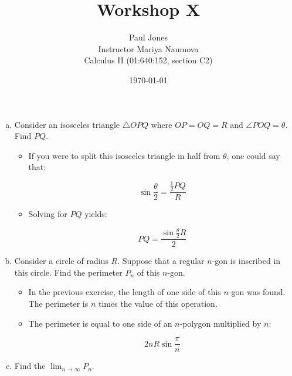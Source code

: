 \documentclass[11pt]{article}
\title{Workshop X}
\author{Paul Jones \\
		Instructor Mariya Naumova\\
		Calculus II (01:640:152, section C2)}
\date{\today}
\begin{document}
\maketitle

\pagebreak

\begin{enumerate}[a)]

	\item Consider an isosceles triangle $\bigtriangleup OPQ$ where $OP = OQ = R$
	and $\angle POQ = \theta$. Find $PQ$.
	
		\begin{itemize}
		
			\item If you were to split this isosceles triangle in half from
			$\theta$, one could say that:
			
			\begin{equation*}
				\sin\frac{\theta}{2} = \frac{\frac{1}{2}PQ}{R}
			\end{equation*}
			
			\item Solving for $PQ$ yields:

			\begin{equation*}
				PQ = \frac{\sin\frac{\theta}{2}R}{2}
			\end{equation*}			
			
		
		\end{itemize}
	
	\item Consider a circle of radius $R$. Suppose that a regular $n$-gon is 
	inscribed in this circle. Find the perimeter $P_n$ of this $n$-gon.
	
		\begin{itemize}
	
			\item In the previous exercise, the length of one side of this 
			$n$-gon was found. The perimeter is $n$ times the value of this
			operation.
			
			\item The perimeter is equal to one side of an $n$-polygon multiplied
			by $n$:
			
			\begin{equation*}
				2 n R \sin\frac{\pi}{n}
			\end{equation*}
		
		\end{itemize}
	
	\item Find the $\lim_{n \to \infty} P_n$.


\end{enumerate}
\end{document}
